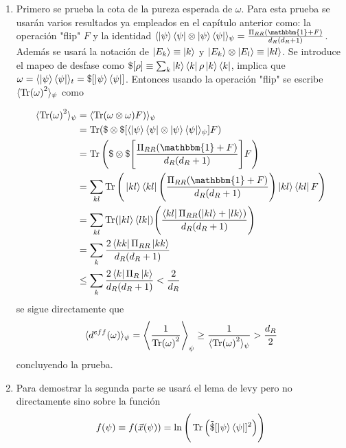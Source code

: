 \begin{enumerate}
\item
Primero se prueba la cota de la pureza esperada de $\omega$. Para esta prueba se usarán varios resultados ya empleados en el capítulo anterior como: la operación "flip"  $F$ y la identidad $\langle \ket{\psi} \bra{\psi} \otimes \ket{\psi} \bra{\psi} \rangle_{\psi} =  \frac{\Pi_{RR}(\mathbbm{1}+F)}{d_{R}(d_{R}+1)}$. Además se usará la notación de $ \ket{E_{k}} \equiv \ket{k}$ y $\ket{E_{k}} \otimes \ket{E_{l}} \equiv \ket{kl}$. Se introduce el mapeo de desfase como $ \$[ \rho ] \equiv  \sum_{k} \ket{k} \bra{k} \rho \ket{k}\bra{k}$, implica que $\omega= \langle \ket{\psi}\bra{\psi} \rangle_{t}= \$ [\ket{\psi}\bra{\psi}]$. Entonces usando la operación "flip"  se escribe $\langle \Tr (\omega)^{2} \rangle_{\psi}$ como
 
\begin{align*}
\langle \Tr (\omega)^{2} \rangle_{\psi} &= \langle \Tr(\omega \otimes \omega)F) \rangle_{\psi}\\
&= \Tr(\$ \otimes \$ [ \langle \ket{\psi} \bra{\psi} \otimes \ket{\psi} \bra{\psi} \rangle_{\psi}]F)\\
&=\Tr \Bigg( \$ \otimes \$ \Bigg[ \frac{\Pi_{RR}(\mathbbm{1}+F)}{d_{R}(d_{R}+1)} \Bigg]F \Bigg)\\
&= \sum_{kl} \Tr \Bigg(  \ket{kl}\bra{kl}  \Bigg(  \frac{\Pi_{RR}(\mathbbm{1}+F)}{d_{R}(d_{R}+1)} \Bigg) \ket{kl}\bra{kl} F \Bigg)\\
&=\sum_{kl} \Tr ( \ket{kl}\bra{lk} ) \Bigg( \frac{\bra{kl} \Pi_{RR}(\ket{kl}+\ket{lk})}{d_{R}(d_{R}+1)}  \Bigg)\\
&=\sum_{k} \frac{2 \bra{kk} \Pi_{RR}\ket{kk}}{d_{R}(d_{R}+1)} \\
&\leq \sum_{k} \frac{2 \bra{k} \Pi_{R}\ket{k}}{d_{R}(d_{R}+1)} < \frac{2}{d_{R}}
\end{align*}
se sigue directamente que 
\begin{equation}
\langle d^{eff}(\omega) \rangle_{\psi} = \Bigg \langle \frac{1}{\Tr (\omega)^{2}} \Bigg \rangle_{\psi} \geq \frac{1}{\langle \Tr (\omega)^{2} \rangle_{\psi}} > \frac{d_{R}}{2}
\end{equation}
concluyendo la prueba.
\item
Para demostrar la segunda parte se usará el lema de levy \cite{lema} pero no directamente sino sobre la función 
\begin{equation}
f(\psi) \equiv f(\vec{x}(\psi)) = \ln \Bigg( \Tr \Big( \tilde{\$}[ \ket{\psi}\bra{\psi}]^{2} \Big) \Bigg)
\end{equation}


\end{enumerate}
